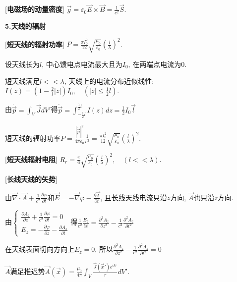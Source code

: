 \clearpage

[\textbf{电磁场的动量密度}] $\vec g=\varepsilon_0\vec E\times\vec B=\frac{1}{c^2}\vec S$.\par

\begin{center}
 \textbf{5.天线的辐射}
\end{center}

[\textbf{短天线的辐射功率}] $P=\frac{\pi I_0^2}{12}\sqrt{\frac{\mu_0}{\varepsilon_0}}\left(\frac{l}{\lambda}\right)^2$.\par
\qquad 设天线长为$l$, 中心馈电点电流最大且为$I_0$, 在两端点电流为$0$.\par
\qquad 短天线满足$l<<\lambda$, 天线上的电流分布近似线性:$I(z)=\left(1-\frac{2}{l}|z|\right)I_0,\quad (|z|\le \frac{1}{2}l)$.\par
\qquad 由$\dot{\vec p}=\int_V\vec JdV'$得$\dot{\vec p}=\int_{-\frac{1}{2}l}^{\frac{1}{2}l}I(z)dz=\frac{1}{2}I_0\vec l$\par
\qquad 短天线的辐射功率$P=\frac{|\ddot{\vec p}|^2}{4\pi\varepsilon_0}\frac{1}{c^3}=\frac{\pi I_0^2}{12}\sqrt{\frac{\mu_0}{\varepsilon_0}}\left(\frac{l}{\lambda}\right)^2$.\par

[\textbf{短天线辐射电阻}] $R_r=\frac{\pi}{6}\sqrt{\frac{\mu_0}{\varepsilon_0}}\left(\frac{l}{\lambda}\right)^2,\quad (l<<\lambda)$.\par

[\textbf{长线天线的矢势}]\par
\qquad 由$\vec\nabla\cdot\vec A+\frac{1}{c^2}\frac{\partial\varphi}{\partial t}$和$\vec E=-\vec\nabla\varphi-\frac{\partial\vec A}{\partial t}$, 且长线天线电流只沿$z$方向, $\vec A$也只沿$z$方向.\par
\qquad 由$\begin{cases}\frac{\partial A_z}{\partial z}+\frac{1}{c^2}\frac{\partial \varphi}{\partial t}=0\\ E_z=-\frac{\partial\varphi}{\partial z}-\frac{\partial A_z}{\partial t}\end{cases}$得$\frac{1}{c^2}\frac{E_z}{\partial t}=\frac{\partial^2A_z}{\partial z^2}-\frac{1}{c^2}\frac{\partial^2A_z}{\partial t^2}$\par
\qquad 在天线表面切向方向上$E_z=0$, 所以$\frac{\partial^2A_z}{\partial z^2}-\frac{1}{c^2}\frac{\partial^2A_z}{\partial t^2}=0$\par
\qquad $\vec A$满足推迟势$\vec A(\vec x)=\frac{\mu_0}{4\pi}\int_V\frac{\vec J(\vec x')e^{ikr}}{r}dV'$.\par

